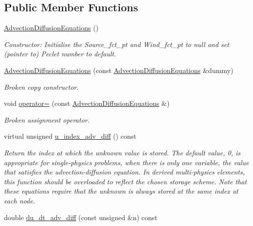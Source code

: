 \subsection*{Public Member Functions}
\begin{DoxyCompactItemize}
\item 
\hyperlink{classoomph_1_1AdvectionDiffusionEquations_a29a6689bdcd6f14bc30bbeaa6e7ccafe}{Advection\+Diffusion\+Equations} ()
\begin{DoxyCompactList}\small\item\em Constructor\+: Initialise the Source\+\_\+fct\+\_\+pt and Wind\+\_\+fct\+\_\+pt to null and set (pointer to) Peclet number to default. \end{DoxyCompactList}\item 
\hyperlink{classoomph_1_1AdvectionDiffusionEquations_aad53e287ed605e9f1080a94d3b351ab7}{Advection\+Diffusion\+Equations} (const \hyperlink{classoomph_1_1AdvectionDiffusionEquations}{Advection\+Diffusion\+Equations} \&dummy)
\begin{DoxyCompactList}\small\item\em Broken copy constructor. \end{DoxyCompactList}\item 
void \hyperlink{classoomph_1_1AdvectionDiffusionEquations_aa80b72531531a916f3b0691b679d5b2a}{operator=} (const \hyperlink{classoomph_1_1AdvectionDiffusionEquations}{Advection\+Diffusion\+Equations} \&)
\begin{DoxyCompactList}\small\item\em Broken assignment operator. \end{DoxyCompactList}\item 
virtual unsigned \hyperlink{classoomph_1_1AdvectionDiffusionEquations_aadffa26c42be5d4a1156a7467de48fb8}{u\+\_\+index\+\_\+adv\+\_\+diff} () const
\begin{DoxyCompactList}\small\item\em Return the index at which the unknown value is stored. The default value, 0, is appropriate for single-\/physics problems, when there is only one variable, the value that satisfies the advection-\/diffusion equation. In derived multi-\/physics elements, this function should be overloaded to reflect the chosen storage scheme. Note that these equations require that the unknown is always stored at the same index at each node. \end{DoxyCompactList}\item 
double \hyperlink{classoomph_1_1AdvectionDiffusionEquations_a2c94e14a6b53e3cce43b83d8c8329174}{du\+\_\+dt\+\_\+adv\+\_\+diff} (const unsigned \&n) const

\end{DoxyCompactItemize}
